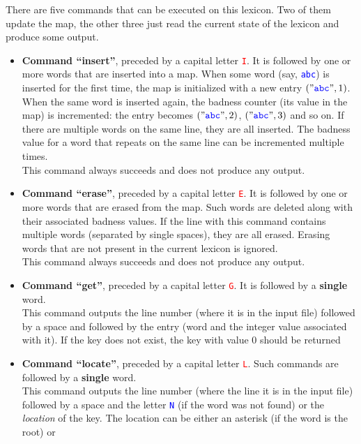 \documentclass[11pt]{article}
\begin{document}
There are five commands that can be
executed on this lexicon. Two of them update the map, 
the other three just read the current state of the lexicon and produce some output.
\begin{itemize}
\item {\bf Command ``insert''}, preceded
by a capital letter \textcolor{red}{\tt I}. 
It is followed by one or more
words that are inserted into a map. 
When some word (say, \textcolor{blue}{\tt abc}) is inserted for the first time, 
the map is initialized with a new entry $(\mathtt{\char`\"}\textcolor{blue}{\mathtt{abc}}\mathtt{\char`\"},1)$. 
When the same word is inserted again, 
the badness counter (its value in the map)
is incremented: the entry becomes $(\mathtt{\char`\"}\textcolor{blue}{\mathtt{abc}}\mathtt{\char`\"},2)$, 
$(\mathtt{\char`\"}\textcolor{blue}{\mathtt{abc}}\mathtt{\char`\"},3)$ and so on.
If there are multiple words on the same line, they are all inserted. 
The badness value for a word that repeats on the same line can be incremented multiple times.\\
This command always succeeds and does not produce any output.
\item {\bf Command ``erase''}, preceded
by a capital letter \textcolor{red}{\tt E}.
It is followed by one or more
words that are erased from the map. 
Such words are deleted along with their associated badness values. 
If the line with this command
contains multiple words (separated by single spaces), 
they are all erased. Erasing words that are not present in the current lexicon is ignored.\\
This command always succeeds and does not produce any output.
\item {\bf Command ``get''}, preceded by a capital letter \textcolor{red}{\tt G}.
It is followed by a {\bf single} word.\\
This command outputs the line number 
(where it is in the input file) followed 
by a space and followed by the 
entry (word and the integer value associated with it). 
If the key does not exist, the key with value $0$ should be returned
\item {\bf Command ``locate''}, preceded 
by a capital letter \textcolor{red}{\tt L}.
Such commands are followed by a {\bf single} word.\\
This command outputs the line number 
(where the line it is in the input file) 
followed by a space and the letter 
\textcolor{blue}{\tt N} (if the word was not found)
or the {\em location} of the key. The location 
can be either an asterisk \textcolor{blue}{\tt *} (if the word is the root) or 

\end{itemize}
\end{document}
